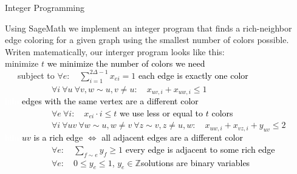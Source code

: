 \documentclass[12pt,a4paper]{amsart}
\makeatletter
\renewcommand\subsection{\@startsection{subsection}{2}
  \z@{.5\linespacing\@plus.7\linespacing}{.5\linespacing}
  {\normalfont\scshape}}
\theoremstyle{definition} %
\theoremstyle{plain} %
\newcommand{\Z}{\mathbb Z}
\makeatother
\begin{document}
    \subsection{Integer Programming}

        Using SageMath we implement an integer program that finds a rich-neighbor edge coloring for a given graph using the smallest number of colors possible. Writen matematically, our interger program looks like this:\\

        \noindent minimize $t$ \hfill \normalsize{\textcolor{black}{we minimize the number of colors we need}}\\
        \ \ \ subject to $\forall e: \quad \sum_{i=1}^{2\Delta - 1} x_{ei} = 1$ \hfill \normalsize{\textcolor{black}{each edge is exactly one color}}\\

        \ \ \ \ \ \ \ \ \ \ \ $\forall i \ \forall u \ \forall v, w \sim u, v \neq u: \quad x_{uv, i} + x_{uw, i} \leq 1$\\[0.1mm]
        \textcolor{white}{hihi} \hfill \normalsize{\textcolor{black}{edges with the same vertex are a different color}}\\

        \ \ \ \ \ \ \ \ \ \ \ $\forall e \ \forall i: \quad x_{ei} \cdot i \leq t$ \hfill \normalsize{\textcolor{black}{we use less or equal to $t$ colors}}\\

        \ \ \ \ \ \ \ \ \ \ \ $\forall i \ \forall uv \ \forall w \sim u, w \neq v \ \forall z \sim v, z \neq u, w: \quad x_{uw, i} + x_{vz, i} + y_{uv} \leq 2$ \hfill \\[0.1mm]
        \textcolor{white}{hihi} \hfill \normalsize{\textcolor{black}{$uv$ is a rich edge $\Leftrightarrow$ all adjacent edges are a different color}}\\

        \ \ \ \ \ \ \ \ \ \ \ $\forall e: \quad \sum_{f \sim e}y_f \geq 1$ \hfill \normalsize{\textcolor{black}{every edge is adjacent to some rich edge}}\\


        \ \ \ \ \ \ \ \ \ \ \ $\forall e: \quad 0 \leq y_{e} \leq 1$, $y_{e} \in \Z$\hfill \normalsize{\textcolor{black}{solutions are binary variables}}\\
\end{document}
